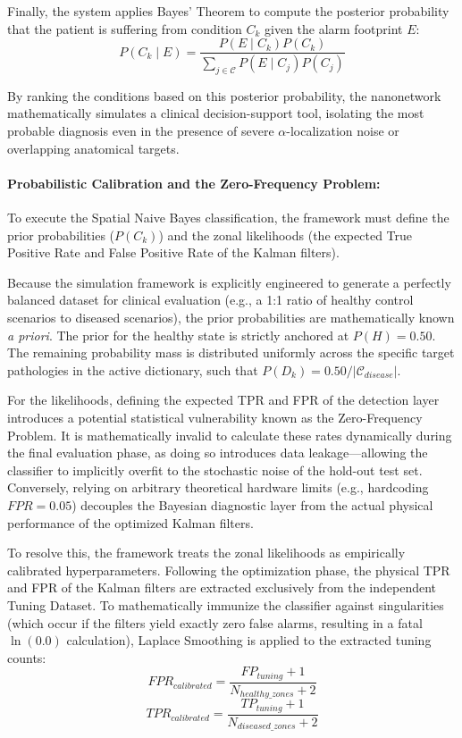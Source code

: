 \documentclass[sigconf]{acmart}
\begin{document}
Finally, the system applies Bayes' Theorem to compute the posterior probability that the patient is suffering from condition $C_k$ given the alarm footprint $E$:
$$P(C_k \mid E)=\frac{P(E \mid C_k)P(C_k)}{\sum_{j \in \mathcal{C}}P(E \mid C_j)P(C_j)}$$

By ranking the conditions based on this posterior probability, the nanonetwork mathematically simulates a clinical decision-support tool, isolating the most probable diagnosis even in the presence of severe $\alpha$-localization noise or overlapping anatomical targets.

\paragraph{Probabilistic Calibration and the Zero-Frequency Problem:}
To execute the Spatial Naive Bayes classification, the framework must define the prior probabilities ($P(C_k)$) and the zonal likelihoods (the expected True Positive Rate and False Positive Rate of the Kalman filters). 

Because the simulation framework is explicitly engineered to generate a perfectly balanced dataset for clinical evaluation (e.g., a 1:1 ratio of healthy control scenarios to diseased scenarios), the prior probabilities are mathematically known \textit{a priori}. The prior for the healthy state is strictly anchored at $P(H) = 0.50$. The remaining probability mass is distributed uniformly across the specific target pathologies in the active dictionary, such that $P(D_k) = 0.50 / |\mathcal{C}_{disease}|$.

For the likelihoods, defining the expected TPR and FPR of the detection layer introduces a potential statistical vulnerability known as the Zero-Frequency Problem. It is mathematically invalid to calculate these rates dynamically during the final evaluation phase, as doing so introduces data leakage—allowing the classifier to implicitly overfit to the stochastic noise of the hold-out test set. Conversely, relying on arbitrary theoretical hardware limits (e.g., hardcoding $FPR = 0.05$) decouples the Bayesian diagnostic layer from the actual physical performance of the optimized Kalman filters.

To resolve this, the framework treats the zonal likelihoods as empirically calibrated hyperparameters. Following the optimization phase, the physical TPR and FPR of the Kalman filters are extracted exclusively from the independent Tuning Dataset. To mathematically immunize the classifier against singularities (which occur if the filters yield exactly zero false alarms, resulting in a fatal $\ln(0.0)$ calculation), Laplace Smoothing is applied to the extracted tuning counts:
$$FPR_{calibrated}=\frac{FP_{tuning}+1}{N_{healthy\_zones}+2}$$
$$TPR_{calibrated}=\frac{TP_{tuning}+1}{N_{diseased\_zones}+2}$$
\end{document}
